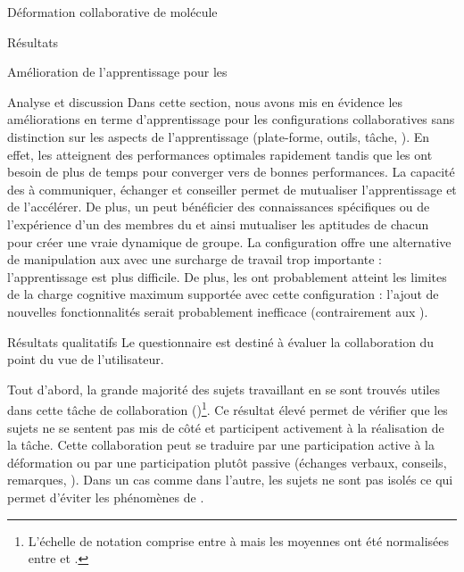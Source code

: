 \documentclass[myfrancais]{mythesis}
\begin{document}
\begin{mychapter}{Déformation collaborative de molécule}
\begin{mysection}{Résultats}
\begin{mysubsection}{Amélioration de l'apprentissage pour les }
\begin{mysubsubsection}{Analyse et discussion}
					Dans cette section, nous avons mis en évidence les améliorations en terme d'apprentissage pour les configurations collaboratives sans distinction sur les aspects de l'apprentissage (plate-forme, outils, tâche, \myetc).
					En effet, les  atteignent des performances optimales rapidement tandis que les  ont besoin de plus de temps pour converger vers de bonnes performances.
					La capacité des  à communiquer, échanger et conseiller permet de mutualiser l'apprentissage et de l'accélérer.
					De plus, un  peut bénéficier des connaissances spécifiques ou de l'expérience d'un des membres du  et ainsi mutualiser les aptitudes de chacun pour créer une vraie dynamique de groupe.
					La configuration  offre une alternative de manipulation aux  avec une surcharge de travail trop importante : l'apprentissage est plus difficile.
					De plus, les  ont probablement atteint les limites de la charge cognitive maximum supportée avec cette configuration : l'ajout de nouvelles fonctionnalités serait probablement inefficace (contrairement aux ).
				\end{mysubsubsection}
			\end{mysubsection}
			\begin{mysubsection}{Résultats qualitatifs}
				Le questionnaire est destiné à évaluer la collaboration du point du vue de l'utilisateur.

				Tout d'abord, la grande majorité des sujets travaillant en  se sont trouvés utiles dans cette tâche de collaboration ()\footnote{L'échelle de notation comprise entre  à  mais les moyennes ont été normalisées entre  et .}.
				Ce résultat élevé permet de vérifier que les sujets ne se sentent pas mis de côté et participent activement à la réalisation de la tâche.
				Cette collaboration peut se traduire par une participation active à la déformation ou par une participation plutôt passive (échanges verbaux, conseils, remarques, \myetc).
				Dans un cas comme dans l'autre, les sujets ne sont pas isolés ce qui permet d'éviter les phénomènes de .


\end{mysubsection}
\end{mysection}
\end{mychapter}
\end{document}
